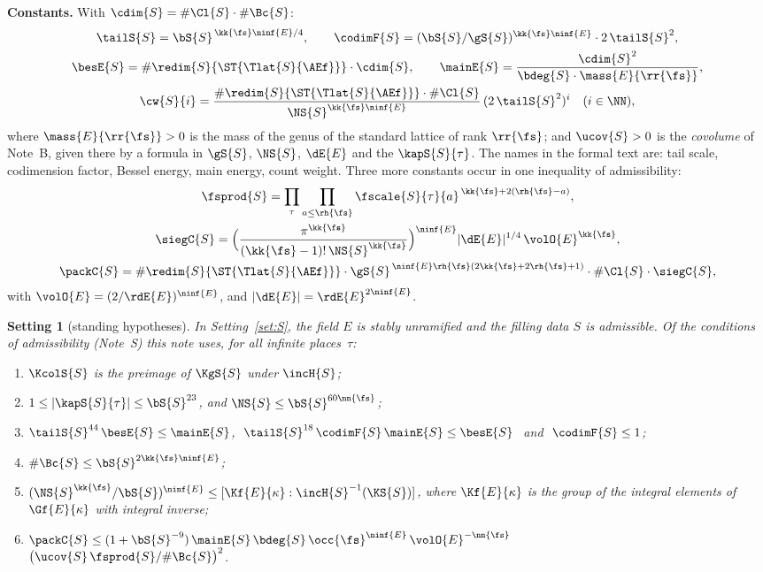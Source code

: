 \documentclass[11pt,a4paper]{article}
\newcommand{\m}[1]{\mbox{$#1$}}        %
\newcommand{\subhead}[1]{\par\addvspace{9pt plus 2pt}\Needspace{4\baselineskip}\noindent\textbf{#1}\enspace\ignorespaces}
\theoremstyle{plainx}
\theoremstyle{uprightx}
\newtheorem{setting}[theorem]{Setting}          %
\renewcommand{\m}[1]{$#1$}
\newcommand{\sk}{\kk{\fs}}
\newcommand{\sn}{\nn{\fs}}
\newcommand{\sro}{\rh{\fs}}
\newcommand{\fE}{\ninf{E}}
\newcommand{\bb}{\bS{S}}
\newcommand{\Nn}{\NS{S}}
\newcommand{\gq}{\gS{S}}
\newcommand{\tl}{\tailS{S}}
\newcommand{\nuS}{\ucov{S}}
\newcommand{\dm}{\mainE{S}}
\newcommand{\dd}{\besE{S}}
\newcommand{\Tl}{\Tlat{S}{\AEf}}
\newcommand{\Sbar}{\redim{S}{\ST{\Tl}}}
\begin{document}
\subhead{Constants.} With \m{\cdim{S}=\#\Cl{S}\cdot\#\Bc{S}}:
\begin{gather*}
\tl=\bb^{\,\sk\fE/4},\qquad \codimF{S}=(\bb/\gq)^{\sk\fE}\cdot2\,\tl^2,\\
\dd=\#\Sbar\cdot\cdim{S},\qquad
\dm=\frac{\cdim{S}^2}{\bdeg{S}\cdot\mass{E}{\rr{\fs}}},\\
\cw{S}{i}=\frac{\#\Sbar\cdot\#\Cl{S}}{\Nn^{\sk\fE}}\,(2\,\tl^2)^{i}\quad(i\in\NN),
\end{gather*}
where \m{\mass{E}{\rr{\fs}}>0} is the mass of the genus of the standard lattice of rank \m{\rr{\fs}}; and
\m{\nuS>0} is the \emph{covolume} of Note~B, given there by a formula in $\gq$, $\Nn$, \m{\dE{E}} and the
\m{\kapS{S}{\tau}}. The names in the formal text are: tail scale, codimension factor, Bessel energy, main energy,
count weight. Three more constants occur in one inequality of admissibility:
\begin{gather*}
\fsprod{S}=\prod_\tau\prod_{a\le\sro}\fscale{S}{\tau}{a}^{\,\sk+2(\sro-a)},\\
\siegC{S}=\Bigl(\frac{\pi^{\sk}}{(\sk-1)!\,\Nn^{\sk}}\Bigr)^{\fE}|\dE{E}|^{1/4}\,\volO{E}^{\sk},\\
\packC{S}=\#\Sbar\cdot\gq^{\,\fE\sro(2\sk+2\sro+1)}\cdot\#\Cl{S}\cdot\siegC{S},
\end{gather*}
with \m{\volO{E}=(2/\rdE{E})^{\fE}}, and \m{|\dE{E}|=\rdE{E}^{2\fE}}.

\begin{setting}[standing hypotheses]\label{set:data}
In Setting~\ref{set:S}, the field $E$ is stably unramified and the filling data $S$ is admissible. Of the
conditions of admissibility (Note~S) this note uses, for all infinite places~$\tau$:
\begin{enumerate}[label=\textup{(A\arabic*)},leftmargin=2.3em,itemsep=2pt]
\item \m{\KcolS{S}} is the preimage of \m{\KgS{S}} under \m{\incH{S}};
\item \m{1\le|\kapS{S}{\tau}|\le\bb^{23}}, and \m{\Nn\le\bb^{60\sn}};
\item \m{\tl^{44}\,\dd\le\dm}, \m{\ \tl^{18}\,\codimF{S}\,\dm\le\dd\ } and \m{\ \codimF{S}\le1};
\item \m{\#\Bc{S}\le\bb^{2\sk\fE}};
\item \m{(\Nn^{\sk}/\bb)^{\fE}\le[\Kf{E}{\kappa}:\incH{S}^{-1}(\KS{S})]}, where \m{\Kf{E}{\kappa}} is the group of
the integral elements of \m{\Gf{E}{\kappa}} with integral inverse;
\item \m{\packC{S}\le(1+\bb^{-9})\,\dm\,\bdeg{S}\,\occ{\fs}^{\fE}\,\volO{E}^{-\sn}}\\
\m{\bigl(\nuS\,\fsprod{S}/\#\Bc{S}\bigr)^{2}}.
\end{enumerate}
\end{setting}
\end{document}
